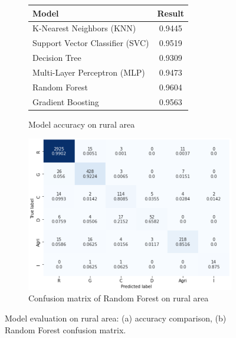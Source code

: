 \documentclass[11pt]{article}
\begin{document}
\par
\begin{figure}[H]
\centering
\begin{subfigure}{0.48\textwidth}
\centering
\begin{tabular}{lc}
\toprule
Model & Result \\
\midrule
K-Nearest Neighbors (KNN) & 0.9445 \\
Support Vector Classifier (SVC) & 0.9519 \\
Decision Tree & 0.9309 \\
Multi-Layer Perceptron (MLP) & 0.9473 \\
Random Forest & 0.9604 \\
Gradient Boosting & 0.9563 \\
\bottomrule
\end{tabular}
\caption{Model accuracy on rural area}
\label{fig:results-rural-table}
\end{subfigure}%
\hfill
\begin{subfigure}{0.48\textwidth}
\centering
\includegraphics[width=\linewidth]{fig6.png}
\caption{Confusion matrix of Random Forest on rural area}
\label{fig:results-rural-confusion}
\end{subfigure}
\caption{Model evaluation on rural area: (a) accuracy comparison, (b) Random Forest confusion matrix.}
\label{fig:results-rural}
\end{figure}
\end{document}

